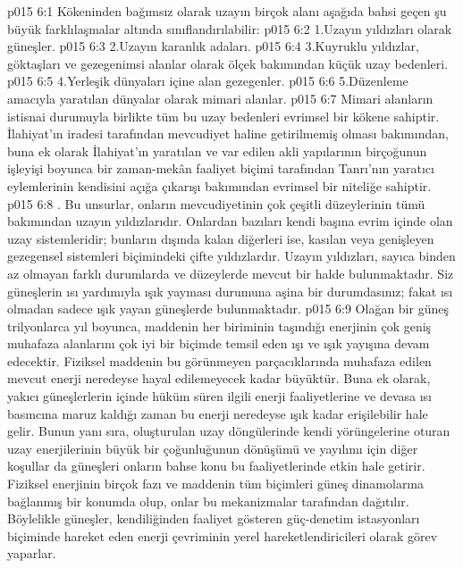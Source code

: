 \vs p015 6:1 Kökeninden bağımsız olarak uzayın birçok alanı aşağıda bahsi geçen şu büyük farklılaşmalar altında sınıflandırılabilir:
\vs p015 6:2 1.\bibnobreakspace Uzayın yıldızları olarak güneşler.
\vs p015 6:3 2.\bibnobreakspace Uzayın karanlık adaları.
\vs p015 6:4 3.\bibnobreakspace Kuyruklu yıldızlar, göktaşları ve gezegenimsi alanlar olarak ölçek bakımından küçük uzay bedenleri.
\vs p015 6:5 4.\bibnobreakspace Yerleşik dünyaları içine alan gezegenler.
\vs p015 6:6 5.\bibnobreakspace Düzenleme amacıyla yaratılan dünyalar olarak mimari alanlar.
\vs p015 6:7 Mimari alanların istisnai durumuyla birlikte tüm bu uzay bedenleri evrimsel bir kökene sahiptir. İlahiyat’ın iradesi tarafından mevcudiyet haline getirilmemiş olması bakımından, buna ek olarak İlahiyat’ın yaratılan ve var edilen akli yapılarının birçoğunun işleyişi boyunca bir zaman\hyp{}mekân faaliyet biçimi tarafından Tanrı’nın yaratıcı eylemlerinin kendisini açığa çıkarışı bakımından evrimsel bir niteliğe sahiptir.
\vs p015 6:8 . Bu unsurlar, onların mevcudiyetinin çok çeşitli düzeylerinin tümü bakımından uzayın yıldızlarıdır. Onlardan bazıları kendi başına evrim içinde olan uzay sistemleridir; bunların dışında kalan diğerleri ise, kasılan veya genişleyen gezegensel sistemleri biçimindeki çifte yıldızlardır. Uzayın yıldızları, sayıca binden az olmayan farklı durumlarda ve düzeylerde mevcut bir halde bulunmaktadır. Siz güneşlerin ısı yardımıyla ışık yayması durumuna aşina bir durumdasınız; fakat ısı olmadan sadece ışık yayan güneşlerde bulunmaktadır.
\vs p015 6:9 Olağan bir güneş trilyonlarca yıl boyunca, maddenin her biriminin taşındığı enerjinin çok geniş muhafaza alanlarını çok iyi bir biçimde temsil eden ışı ve ışık yayışına devam edecektir. Fiziksel maddenin bu görünmeyen parçacıklarında muhafaza edilen mevcut enerji neredeyse hayal edilemeyecek kadar büyüktür. Buna ek olarak, yakıcı güneşlerlerin içinde hüküm süren ilgili enerji faaliyetlerine ve devasa ısı basıncına maruz kaldığı zaman bu enerji neredeyse ışık kadar erişilebilir hale gelir. Bunun yanı sıra, oluşturulan uzay döngülerinde kendi yörüngelerine oturan uzay enerjilerinin büyük bir çoğunluğunun dönüşümü ve yayılımı için diğer koşullar da güneşleri onların bahse konu bu faaliyetlerinde etkin hale getirir. Fiziksel enerjinin birçok fazı ve maddenin tüm biçimleri güneş dinamolarına bağlanmış bir konumda olup, onlar bu mekanizmalar tarafından dağıtılır. Böylelikle güneşler, kendiliğinden faaliyet gösteren güç\hyp{}denetim istasyonları biçiminde hareket eden enerji çevriminin yerel hareketlendiricileri olarak görev yaparlar.
